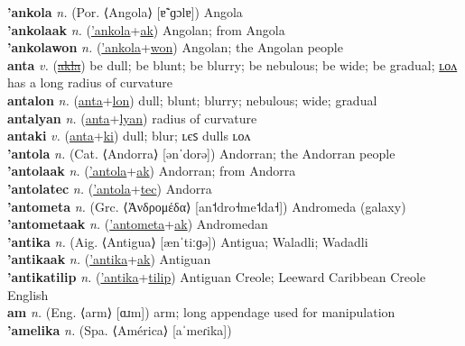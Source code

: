 \textbf{'ankola} \textit{n.} (Por. ⟨Angola⟩ [ɐ̃ˈɡɔlɐ])
Angola \label{'ankola} \\
\textbf{'ankolaak} \textit{n.} (\hyperref['ankola]{'ankola}+\hyperref[ak]{ak})
Angolan; from Angola \label{'ankolaak} \\
\textbf{'ankolawon} \textit{n.} (\hyperref['ankola]{'ankola}+\hyperref[won]{won})
Angolan; the Angolan people \label{'ankolawon} \\
\textbf{anta} \textit{v.} (\hyperref[akla]{\sout{akla}})
be dull; be blunt; be blurry; be nebulous; be wide; be gradual; \hyperref[antalon]{ʟᴏᴧ} has a long radius of curvature \label{anta} \\
\textbf{antalon} \textit{n.} (\hyperref[anta]{anta}+\hyperref[lon]{lon})
dull; blunt; blurry; nebulous; wide; gradual \label{antalon} \\
\textbf{antalyan} \textit{n.} (\hyperref[anta]{anta}+\hyperref[lyan]{lyan})
radius of curvature \label{antalyan} \\
\textbf{antaki} \textit{v.} (\hyperref[anta]{anta}+\hyperref[ki]{ki})
dull; blur; ʟєꜱ dulls ʟᴏᴧ \label{antaki} \\
\textbf{'antola} \textit{n.} (Cat. ⟨Andorra⟩ [ənˈdorə])
Andorran; the Andorran people \label{'antola} \\
\textbf{'antolaak} \textit{n.} (\hyperref['antola]{'antola}+\hyperref[ak]{ak})
Andorran; from Andorra \label{'antolaak} \\
\textbf{'antolatec} \textit{n.} (\hyperref['antola]{'antola}+\hyperref[tec]{tec})
Andorra \label{'antolatec} \\
\textbf{'antometa} \textit{n.} (Grc. ⟨Ἀνδρομέδα⟩ [an˦dro˧me˦da˧])
Andromeda (galaxy) \label{'antometa} \\
\textbf{'antometaak} \textit{n.} (\hyperref['antometa]{'antometa}+\hyperref[ak]{ak})
Andromedan \label{'antometaak} \\
\textbf{'antika} \textit{n.} (Aig. ⟨Antigua⟩ [ænˈtiːɡə])
Antigua; Waladli; Wadadli \label{'antika} \\
\textbf{'antikaak} \textit{n.} (\hyperref['antika]{'antika}+\hyperref[ak]{ak})
Antiguan \label{'antikaak} \\
\textbf{'antikatilip} \textit{n.} (\hyperref['antika]{'antika}+\hyperref[tilip]{tilip})
Antiguan Creole; Leeward Caribbean Creole English \label{'antikatilip} \\
\textbf{am} \textit{n.} (Eng. ⟨arm⟩ [ɑɹm])
arm; long appendage used for manipulation \label{am} \\
\textbf{'amelika} \textit{n.} (Spa. ⟨América⟩ [aˈmeɾika])
